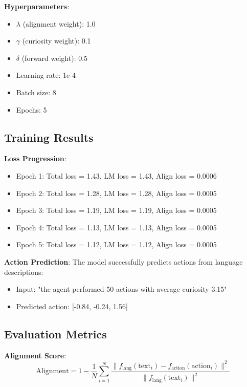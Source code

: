 \documentclass{IEEEtran}
\begin{document}
\textbf{Hyperparameters}:
\begin{itemize}
    \item $\lambda$ (alignment weight): 1.0
    \item $\gamma$ (curiosity weight): 0.1
    \item $\delta$ (forward weight): 0.5
    \item Learning rate: 1e-4
    \item Batch size: 8
    \item Epochs: 5
\end{itemize}

\subsection{Training Results}

\textbf{Loss Progression}:
\begin{itemize}
    \item Epoch 1: Total loss = 1.43, LM loss = 1.43, Align loss = 0.0006
    \item Epoch 2: Total loss = 1.28, LM loss = 1.28, Align loss = 0.0005
    \item Epoch 3: Total loss = 1.19, LM loss = 1.19, Align loss = 0.0005
    \item Epoch 4: Total loss = 1.13, LM loss = 1.13, Align loss = 0.0005
    \item Epoch 5: Total loss = 1.12, LM loss = 1.12, Align loss = 0.0005
\end{itemize}

\textbf{Action Prediction}: The model successfully predicts actions from language descriptions:
\begin{itemize}
    \item Input: "the agent performed 50 actions with average curiosity 3.15"
    \item Predicted action: [-0.84, -0.24, 1.56]
\end{itemize}

\subsection{Evaluation Metrics}

\textbf{Alignment Score}:
\begin{equation}
\text{Alignment} = 1 - \frac{1}{N} \sum_{i=1}^N \frac{\|f_{\text{lang}}(\text{text}_i) - f_{\text{action}}(\text{action}_i)\|^2}{\|f_{\text{lang}}(\text{text}_i)\|^2}
\end{equation}
\end{document}
